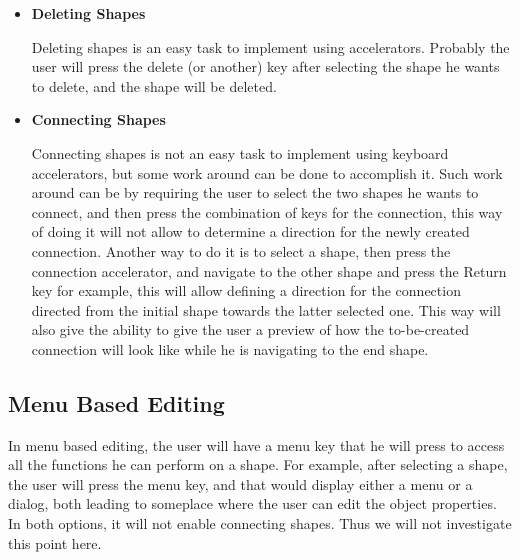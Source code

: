 \begin{itemize}
\item {\bf Deleting Shapes}
\par \noindent
	Deleting shapes is an easy task to implement using accelerators. Probably the user will press the delete (or another) key after selecting the shape he wants to delete, and the shape will be deleted.

\item {\bf Connecting Shapes}
\par \noindent
Connecting shapes is not an easy task to implement using keyboard accelerators, but some work around can be done to accomplish it. Such work around can be by requiring the user to select the two shapes he wants to connect, and then press the combination of keys for the connection, this way of doing it will not allow to determine a direction for the newly created connection. Another way to do it is to select a shape,  then press the connection accelerator, and navigate to the other shape and press the Return key for example, this will allow defining a direction for the connection directed from the initial shape towards the latter selected one. This way will also give the ability to give the user a preview of how the to-be-created connection will look like while he is navigating to the end shape.

\end{itemize}

\subsection{Menu Based Editing}
In menu based editing, the user will have a menu key that he will press to access all the functions he can perform on a shape. For example, after selecting a shape, the user will press the menu key, and that would display either a menu or a dialog, both leading to someplace where the user can edit the object properties. In both options, it will not enable connecting shapes. Thus we will not investigate this point here.

